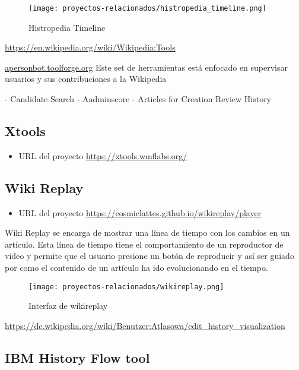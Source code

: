 \begin{figure}[H]
    \centering
    \texttt{[image: proyectos-relacionados/histropedia\_timeline.png]}
    \caption{Histropedia Timeline}
    \label{fig:histropedia_timeline}
\end{figure}


\url{https://en.wikipedia.org/wiki/Wikipedia:Tools}

\url{apersonbot.toolforge.org}
Este set de herramientas está enfocado en supervisar usuarios y sus contribuciones a la Wikipedia

- Candidate Search
- Aadminscore
- Articles for Creation Review History

\subsection{Xtools}
\begin{itemize}
    \item URL del proyecto \url{https://xtools.wmflabs.org/}
\end{itemize}

\subsection{Wiki Replay}
\begin{itemize}
    \item URL del proyecto \url{https://cosmiclattes.github.io/wikireplay/player}
\end{itemize}

Wiki Replay se encarga de mostrar una línea de tiempo con los cambios en un artículo. Esta línea de tiempo
tiene el comportamiento de un reproductor de video y permite que el usuario presione un botón de
reproducir y así ser guiado por como el contenido de un artículo ha ido evolucionando en el tiempo.

\begin{figure}[H]
    \centering
    \texttt{[image: proyectos-relacionados/wikireplay.png]}
    \caption{Interfaz de wikireplay}
    \label{wikireplay}
\end{figure}


\url{https://de.wikipedia.org/wiki/Benutzer:Atlasowa/edit_history_visualization}

\subsection{IBM History Flow tool}

